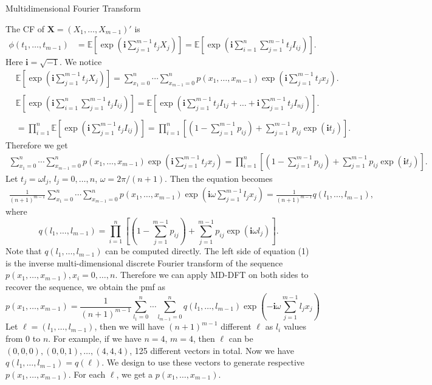 \documentclass[12pt]{article}
\newcommand{\EE}{\mathbb{E}}
\newcommand{\Xmat}{\mathbf{X}}
\newcommand{\ivec}{{\boldsymbol{i}}}
\begin{document}
Multidimensional Fourier Transform


The CF of $\Xmat=(X_1, \dots, X_{m-1})'$ is
\begin{align*}
\phi(t_1, \dots, t_{m-1}) & = \EE\left[\exp\left(\ivec\sum_{j=1}^{m-1}t_jX_j\right)\right]=\EE\left[\exp\left(\ivec\sum_{i = 1}^n \sum_{j=1}^{m-1}t_j I_{ij}\right)\right].
\end{align*}
Here $\ivec=\sqrt{-1}$. We notice
\begin{equation*}
\begin{split}
  &\EE\left[\exp\left(\ivec\sum_{j=1}^{m-1}t_jX_j\right)\right] = \sum_{x_1 = 0}^{n}\cdots \sum_{x_{m-1} = 0}^n p(x_1,\ldots,x_{m-1})\exp\left(\ivec\sum_{j=1}^{m-1}t_jx_j\right).\\
  \\
  &\EE\left[\exp\left(\ivec\sum_{i = 1}^n \sum_{j=1}^{m-1}t_j I_{ij}\right)\right] = \EE\left[ \exp\left( \ivec\sum_{j=1}^{m-1} t_jI_{1j} + \dots + \ivec\sum_{j=1}^{m-1} t_jI_{nj}\right)\right].\\
  \\
  & = \prod_{i=1}^n \EE\left[ \exp\left( \ivec \sum_{j=1}^{m-1} t_j I_{ij}\right)\right] = \prod_{i=1}^n \left[(1 - \sum_{j=1}^{m-1}p_{ij})+\sum_{j=1}^{m-1}p_{ij}\exp(\ivec t_j)\right].
\end{split}
\end{equation*}
Therefore we get
\begin{align*}
\sum_{x_1 = 0}^{n}\cdots \sum_{x_{m-1} = 0}^n p(x_1,\ldots,x_{m-1})\exp\left(\ivec\sum_{j=1}^{m-1}t_jx_j\right)= \prod_{i=1}^{n}\left[(1 - \sum_{j=1}^{m-1}p_{ij})+\sum_{j=1}^{m-1}p_{ij}\exp(\ivec t_j)\right].
\end{align*}
Let $t_j = \omega l_j$, $l_j = 0, \ldots, n$, $\omega = 2\pi/(n+1)$. Then the equation becomes
\begin{align}
\frac{1}{(n+1)^{m-1}} \sum_{x_1 = 0}^{n}\cdots \sum_{x_{m-1} = 0}^n p(x_1,\ldots,x_{m-1}) \exp\left(\ivec\omega\sum_{j=1}^{m-1}l_j x_j\right)= \frac{1}{(n+1)^{m-1}} q(l_1, \ldots, l_{m-1}),
\end{align}
where
$$ q(l_1, \ldots, l_{m-1})=\prod_{i=1}^{n}\left[(1 - \sum_{j=1}^{m-1}p_{ij})+\sum_{j=1}^{m-1}p_{ij}\exp(\ivec \omega l_j)\right].$$	
Note that $q(l_1, \ldots, l_{m-1})$ can be computed directly. The left side of equation (1) is the inverse multi-dimensional discrete Fourier transform of the sequence $ p(x_1,\ldots,x_{m-1}), x_i = 0 , \dots, n$. Therefore we can apply MD-DFT on both sides to recover the sequence, we obtain the pmf as
\begin{equation}
p(x_1, \ldots, x_{m-1}) = \frac{1}{(n+1)^{m-1}}\sum_{l_1 = 0}^{n}\cdots \sum_{l_{m-1} = 0}^n q(l_1, \ldots, l_{m-1}) \exp\left(-\ivec\omega\sum_{j=1}^{m-1}l_j x_j\right)
\end{equation}
Let $\ell = (l_1,\dots,l_{m-1})$, then we will have $(n
+1)^{m-1}$ different $\ell$ as $l_i$ values from $0$ to $n$. For example, if we have $n=4$, $m=4$, then $\ell$ can be $(0, 0, 0), (0, 0, 1), \dots, (4, 4, 4)$, 125 different vectors in total. Now we have $q(l_1,\dots,l_{m-1}) = q(\ell)$. We design to use these vectors to generate respective $p(x_1,\dots,x_{m-1})$. For each $\ell$, we get a $p(x_1,\dots,x_{m-1})$.
\end{document}
